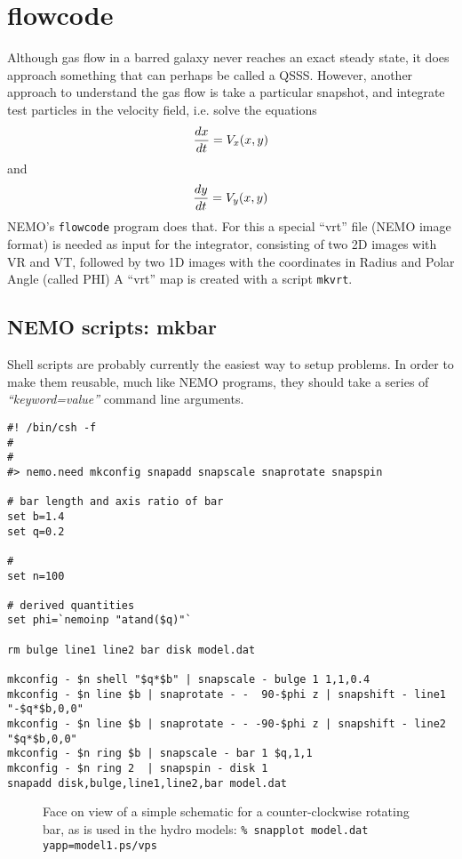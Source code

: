 \documentclass[11pt]{article}
\begin{document}
\section{flowcode}

Although gas flow in a barred galaxy never reaches an
exact steady state, it does approach something
that can perhaps be called a QSSS. However, another approach
to understand the gas flow is take a particular snapshot, and
integrate test particles in the velocity field, i.e.
solve the equations
$$
	{dx \over dt } = V_x(x,y)
$$
and
$$
	{dy \over dt } = V_y(x,y)
$$
NEMO's {\tt flowcode} program does that. For this a special
``vrt'' file (NEMO image format) is needed as input for the
integrator, consisting
of two 2D images with VR and VT, followed by two 1D images
with the coordinates in Radius and Polar Angle (called PHI)
A ``vrt'' map is created with a script {\tt mkvrt}.

\subsection{NEMO scripts: mkbar}

Shell scripts are probably currently the easiest way to setup
problems. In order to make them reusable, much like NEMO
programs, they should take a series of {\it ``keyword=value''}
command line arguments.

\footnotesize\begin{verbatim}
#! /bin/csh -f
#
#
#> nemo.need mkconfig snapadd snapscale snaprotate snapspin

# bar length and axis ratio of bar
set b=1.4
set q=0.2

# 
set n=100

# derived quantities
set phi=`nemoinp "atand($q)"`

rm bulge line1 line2 bar disk model.dat

mkconfig - $n shell "$q*$b" | snapscale - bulge 1 1,1,0.4
mkconfig - $n line $b | snaprotate - -  90-$phi z | snapshift - line1 "-$q*$b,0,0"
mkconfig - $n line $b | snaprotate - - -90-$phi z | snapshift - line2 "$q*$b,0,0"
mkconfig - $n ring $b | snapscale - bar 1 $q,1,1
mkconfig - $n ring 2  | snapspin - disk 1
snapadd disk,bulge,line1,line2,bar model.dat 

\end{verbatim}\normalsize

\begin{figure}[htbp]
\epsfysize=5cm
\caption{Face on view of a simple schematic for a counter-clockwise
rotating bar, as is used in the hydro models:\newline
 \tt \% snapplot model.dat yapp=model1.ps/vps
}
\end{figure}
\end{document}
